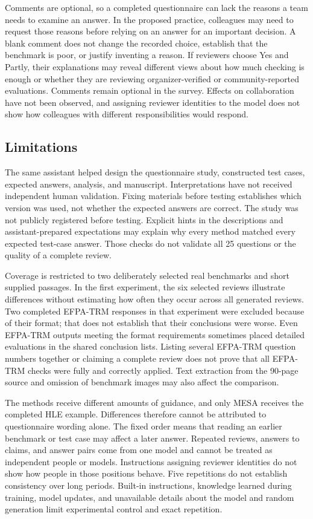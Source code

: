 \documentclass[10pt,conference]{IEEEtran}
\begin{document}
Comments are optional, so a completed questionnaire can lack the reasons a team needs to examine an answer. In the proposed practice, colleagues may need to request those reasons before relying on an answer for an important decision. A blank comment does not change the recorded choice, establish that the benchmark is poor, or justify inventing a reason. If reviewers choose Yes and Partly, their explanations may reveal different views about how much checking is enough or whether they are reviewing organizer-verified or community-reported evaluations. Comments remain optional in the survey. Effects on collaboration have not been observed, and assigning reviewer identities to the model does not show how colleagues with different responsibilities would respond.

\subsection{Limitations}
The same assistant helped design the questionnaire study, constructed test cases, expected answers, analysis, and manuscript. Interpretations have not received independent human validation. Fixing materials before testing establishes which version was used, not whether the expected answers are correct. The study was not publicly registered before testing. Explicit hints in the descriptions and assistant-prepared expectations may explain why every method matched every expected test-case answer. Those checks do not validate all 25 questions or the quality of a complete review.

Coverage is restricted to two deliberately selected real benchmarks and short supplied passages. In the first experiment, the six selected reviews illustrate differences without estimating how often they occur across all generated reviews. Two completed EFPA-TRM responses in that experiment were excluded because of their format; that does not establish that their conclusions were worse. Even EFPA-TRM outputs meeting the format requirements sometimes placed detailed evaluations in the shared conclusion lists. Listing several EFPA-TRM question numbers together or claiming a complete review does not prove that all EFPA-TRM checks were fully and correctly applied. Text extraction from the 90-page source and omission of benchmark images may also affect the comparison.

The methods receive different amounts of guidance, and only MESA receives the completed HLE example. Differences therefore cannot be attributed to questionnaire wording alone. The fixed order means that reading an earlier benchmark or test case may affect a later answer. Repeated reviews, answers to claims, and answer pairs come from one model and cannot be treated as independent people or models. Instructions assigning reviewer identities do not show how people in those positions behave. Five repetitions do not establish consistency over long periods. Built-in instructions, knowledge learned during training, model updates, and unavailable details about the model and random generation limit experimental control and exact repetition.
\end{document}
